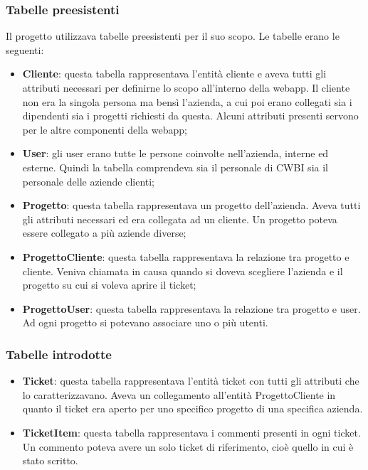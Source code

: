 \subsubsection*{Tabelle preesistenti}
Il progetto utilizzava tabelle preesistenti per il suo scopo. Le tabelle erano le seguenti: 
\begin{itemize}


    \item \textbf{Cliente}: questa tabella rappresentava l'entità cliente e aveva tutti gli attributi necessari per definirne lo scopo all'interno della webapp. Il cliente non era la singola persona ma bensì l'azienda, a cui poi erano collegati sia i dipendenti sia i progetti richiesti da questa. Alcuni attributi presenti servono per le altre componenti della webapp;
    \item \textbf{User}: gli user erano tutte le persone coinvolte nell'azienda, interne ed esterne. Quindi la tabella comprendeva sia il personale di CWBI sia il personale delle aziende clienti;
    \item \textbf{Progetto}: questa tabella rappresentava un progetto dell'azienda. Aveva tutti gli attributi necessari ed era collegata ad un cliente. Un progetto poteva essere collegato a più aziende diverse;
    \item \textbf{ProgettoCliente}: questa tabella rappresentava la relazione tra progetto e cliente. Veniva chiamata in causa quando si doveva scegliere l'azienda e il progetto su cui si voleva aprire il ticket;
        \item \textbf{ProgettoUser}: questa tabella rappresentava la relazione tra progetto e user. Ad ogni progetto si potevano associare uno o più utenti.
\end{itemize}

\subsubsection*{Tabelle introdotte}
\begin{itemize}
	\item \textbf{Ticket}: questa tabella rappresentava l'entità ticket con tutti gli attributi che lo caratterizzavano. Aveva un collegamento all'entità ProgettoCliente in quanto il ticket era aperto per uno specifico progetto di una specifica azienda.
	
	\item \textbf{TicketItem}: questa tabella rappresentava i commenti presenti in ogni ticket. Un commento poteva avere un solo ticket di riferimento, cioè quello in cui è stato scritto.
\end{itemize}


